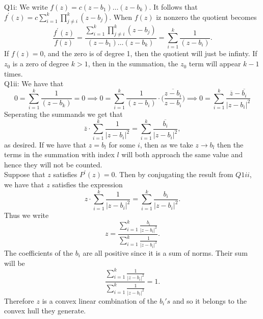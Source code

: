\documentclass[letterpaper]{article}
\newcommand{\ol}{\overline}
\begin{document}
\noindent Q1i: We write $f(z) = c(z-b_1)\dots(z-b_k).$ It follows that $f^\prime(z) = c \sum_{i=1}^k \prod_{j\neq i}^k (z-b_j)$. When $f(z)$ iz nonzero the quotient becomes $$\frac{f^\prime(z) }{f(z)} = \frac{\sum_{i=1}^k \prod_{j\neq i}^k (z-b_j)}{(z-b_1)\dots(z-b_k)} = \sum_{i=1}^k \frac{1}{(z-b_i)}. $$
If $f(z)=0$, and the zero is of degree 1, then the quotient will just be infinty. If $z_0$ is a zero of degree $k>1$,  then in the summation, the $z_0$ term will appear $k-1$ times. 
\newline \\ Q1ii: We have that $$0 = \sum_{i=1}^k \frac{1}{(z-b_k)} = 0 \implies 0 = \sum_{i=1}^k \frac{1}{(z-b_i)} \cdot \ol{ \Big( \frac{z-b_i}{z-b_i}\Big) } \implies 0 = \sum_{i=1}^k \frac{\ol{z} - \ol{b_i}}{|z-b_i|^2}$$
Seperating the summands we get that $$\ol{z} \cdot \sum_{i=1}^k \frac{1}{|z-b_i|^2} = \sum_{i=1}^k \frac{\ol{b_i}}{|z-b_i|^2},$$ as desired. If we have that $z = b_l$ for some $i$, then as we take $z \to b_l$ then the terms in the summation with index $l$ will both approach the same value and hence they will not be counted. 
\newline \\ Suppose that $z$ satisfies $P^\prime(z) = 0$. Then by conjugating the result from $Q1ii$, we have that $z$ satisfies the expression $$z \cdot \sum_{i=1}^k\frac{1}{|z-b_i|^2} = \sum_{i=1}^k \frac{b_i}{|z-b_i|^2}.$$
Thus we write $$z = \frac{\sum_{i=1}^k \frac{b_i}{|z-b_i|^2}}{\sum_{i=1}^k\frac{1}{|z-b_i|^2} }.$$ The coefficients of the $b_i$ are all positive since it is a sum of norms. Their sum will be $$\frac{\sum_{i=1}^k \frac{1}{|z-b_i|^2}}{\sum_{i=1}^k\frac{1}{|z-b_i|^2} }= 1.$$ Therefore $z$ is a convex linear combination of the $b_i's$ and so it belongs to the convex hull they generate.  
\end{document}

